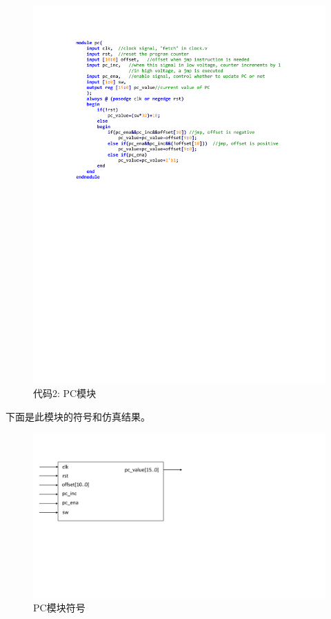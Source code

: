 \documentclass[titlepage, 11pt]{article}
\begin{document}
		\begin{figure}[H]
			\centering
			\includegraphics[scale=1]{16.pdf}
			\caption*{代码2: PC模块}
		\end{figure}
		\par 下面是此模块的符号和仿真结果。
		\begin{figure}[H]
			\includegraphics[scale=0.5]{17.pdf}
			\caption{PC模块符号}
		\end{figure}
\end{document}
